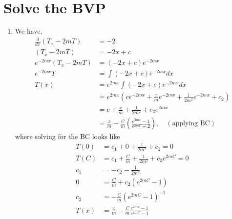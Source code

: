 \documentclass{article}
\begin{document}
\section{Solve the BVP}
    \begin{enumerate}[label=\roman*)]
        \item We have, 
        \begin{align*}
            \frac{d}{dx}\left(T_x - 2mT\right) &= -2
            \\
            \left(T_x - 2mT\right) &= -2x + c
            \\
            e^{-2mx}\left(T_x - 2mT\right) &= (-2x + c)e^{-2mx}
            \\
            e^{-2mx}T &= \int (-2x+c)e^{-2mx}dx
            \\
            T(x) &= e^{2mx}\int (-2x+c)e^{-2mx}dx
            \\
            &= e^{2mx}\left(ce^{-2mx} + \frac{x}{m}e^{-2mx} +
            \frac{1}{2m^2}e^{-2mx} + c_2\right)
            \\
            &= c + \frac{x}{m} + \frac{1}{2m^2} + c_2e^{2mx}
            \\
            &= \frac{x}{m} - \frac{C}{m}\left(\frac{e^{2mx} - 1}{e^{2mC} -
            2}\right), \quad (\text{applying BC})
        \end{align*}
        where solving for the BC looks like
        \begin{align*}
            T(0) &= c_1 + 0 + \frac{1}{2m^2} + c_2 = 0\\
            T(C) &= c_1 + \frac{C}{m} + \frac{1}{2m^2} + c_2e^{2mC} = 0\\
            c_1 &= -c_2 - \frac{1}{2m^2}
            \\
            0 &= \frac{C}{m} + c_2\left(e^{2mC} - 1\right)
            \\
            c_2 &= -\frac{C}{m}\left(e^{2mC} - 1\right)^{-1}
            \\
            T(x) &= \frac{x}{m} - \frac{C}{m}\frac{e^{2mx} - 1}{e^{2mC} - 1}
        \end{align*}
    \end{enumerate}
\end{document}
